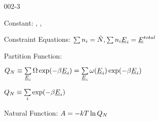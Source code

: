 \begin{mitframe}{002-3}

    
\begin{listone}
    
    \item Constant: \nummoles, \uline{\vol}, \Temp
    
    \item Constraint Equations: $\sum\nolimits \molspecies{i} = \totmoles, \sum\nolimits \molspecies{i}\uline{\energy}_{i} = \uline{\energy}^{total}  $     %
    
    \item Partition Function:
    
    \begin{listtwo}
    
    	\item $\cpf \equiv \sum\limits_{\uline{\energy}_{i}} \mpc\exp(-\boltznorm\uline{\energy}_{i}) = \sum\limits_{\uline{\energy}_{i}} \mpf(\uline{\energy}_{i})\exp(-\boltznorm\uline{\energy}_{i}) $
    
    	\item $\cpf \equiv \sum\limits_{i} \exp(-\boltznorm\uline{\energy}_{i}) $
           
    \end{listtwo}
           
    \item Natural Function: $\helmholtz = -\thermcond\Temp\ln\cpf$
    
\end{listone}
    
\end{mitframe}